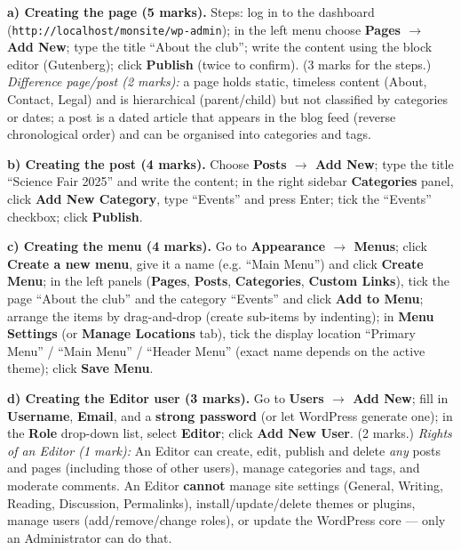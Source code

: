 \documentclass[11pt]{article}
\newcommand{\cle}[1]{{\popxbold\color{popdark}#1}}
\begin{document}
\begin{corrige}
\textbf{a) Creating the page (5 marks).} Steps: log in to the dashboard (\texttt{http://localhost/monsite/wp-admin}); in the left menu choose \textbf{Pages $\rightarrow$ Add New}; type the title ``About the club''; write the content using the block editor (Gutenberg); click \textbf{Publish} (twice to confirm). (3 marks for the steps.)
\emph{Difference page/post (2 marks):} a \cle{page} holds static, timeless content (About, Contact, Legal) and is hierarchical (parent/child) but not classified by categories or dates; a \cle{post} is a dated article that appears in the blog feed (reverse chronological order) and can be organised into categories and tags.

\textbf{b) Creating the post (4 marks).} Choose \textbf{Posts $\rightarrow$ Add New}; type the title ``Science Fair 2025'' and write the content; in the right sidebar \textbf{Categories} panel, click \textbf{Add New Category}, type ``Events'' and press Enter; tick the ``Events'' checkbox; click \textbf{Publish}.

\textbf{c) Creating the menu (4 marks).} Go to \textbf{Appearance $\rightarrow$ Menus}; click \textbf{Create a new menu}, give it a name (e.g. ``Main Menu'') and click \textbf{Create Menu}; in the left panels (\textbf{Pages}, \textbf{Posts}, \textbf{Categories}, \textbf{Custom Links}), tick the page ``About the club'' and the category ``Events'' and click \textbf{Add to Menu}; arrange the items by drag-and-drop (create sub-items by indenting); in \textbf{Menu Settings} (or \textbf{Manage Locations} tab), tick the display location ``Primary Menu'' / ``Main Menu'' / ``Header Menu'' (exact name depends on the active theme); click \textbf{Save Menu}.

\textbf{d) Creating the Editor user (3 marks).} Go to \textbf{Users $\rightarrow$ Add New}; fill in \textbf{Username}, \textbf{Email}, and a \textbf{strong password} (or let WordPress generate one); in the \textbf{Role} drop-down list, select \textbf{Editor}; click \textbf{Add New User}. (2 marks.)
\emph{Rights of an Editor (1 mark):} An Editor can create, edit, publish and delete \emph{any} posts and pages (including those of other users), manage categories and tags, and moderate comments. An Editor \textbf{cannot} manage site settings (General, Writing, Reading, Discussion, Permalinks), install/update/delete themes or plugins, manage users (add/remove/change roles), or update the WordPress core --- only an Administrator can do that.


\end{corrige}
\end{document}
